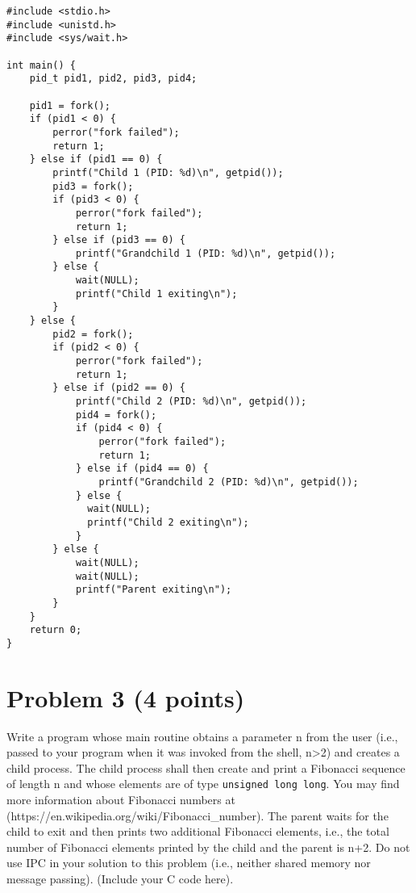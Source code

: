 \documentclass{article}
\begin{document}
\lstset{language=C, basicstyle=\ttfamily\footnotesize}
\begin{lstlisting}
#include <stdio.h>
#include <unistd.h>
#include <sys/wait.h>

int main() {
    pid_t pid1, pid2, pid3, pid4;

    pid1 = fork();
    if (pid1 < 0) {
        perror("fork failed");
        return 1;
    } else if (pid1 == 0) {
        printf("Child 1 (PID: %d)\n", getpid());
        pid3 = fork();
        if (pid3 < 0) {
            perror("fork failed");
            return 1;
        } else if (pid3 == 0) {
            printf("Grandchild 1 (PID: %d)\n", getpid());
        } else {
            wait(NULL);
            printf("Child 1 exiting\n");
        }
    } else {
        pid2 = fork();
        if (pid2 < 0) {
            perror("fork failed");
            return 1;
        } else if (pid2 == 0) {
            printf("Child 2 (PID: %d)\n", getpid());
            pid4 = fork();
            if (pid4 < 0) {
                perror("fork failed");
                return 1;
            } else if (pid4 == 0) {
                printf("Grandchild 2 (PID: %d)\n", getpid());
            } else {
              wait(NULL);
              printf("Child 2 exiting\n");
            }
        } else {
            wait(NULL);
            wait(NULL);
            printf("Parent exiting\n");
        }
    }
    return 0;
}
\end{lstlisting}


\section*{Problem 3 (4 points)}

Write a program whose main routine obtains a parameter n from the user (i.e., passed to your program when it was invoked from the shell, n>2) and creates a child process. The child process shall then create and print a Fibonacci sequence of length n and whose elements are of type \texttt{unsigned long long}. You may find more information about Fibonacci numbers at (https://en.wikipedia.org/wiki/Fibonacci\_number). The parent waits for the child to exit and then prints two additional Fibonacci elements, i.e., the total number of Fibonacci elements printed by the child and the parent is n+2. Do not use IPC in your solution to this problem (i.e., neither shared memory nor message passing). (Include your C code here).
\end{document}
